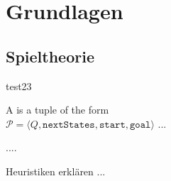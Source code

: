 \chapter{Grundlagen}
\section{Spieltheorie}
test23 \cite{Russell.2016}


\begin{Definition}[Game]
  A  is a tuple of the form
  \\[0.2cm]
  \hspace*{1.3cm}
  $\mathcal{P} = \langle Q,\mathtt{nextStates}, \mathtt{start}, \mathtt{goal}\rangle$
...

....

Heuristiken erklären 
...
\end{Definition}